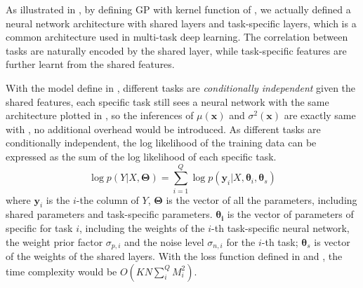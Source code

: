 As illustrated in , by defining GP with kernel function of , we actually defined a neural network architecture with shared layers and task-specific layers, which is a common architecture used in multi-task deep learning\cite{ruder2017overview}. The correlation between tasks are naturally encoded by the shared layer, while task-specific features are further learnt from the shared features. 

With the model define in , different tasks are \emph{conditionally independent} given the shared features, each specific task still sees a neural network with the same architecture plotted in , so the inferences of $\mu(\bm{x})$ and $\sigma^2(\bm{x})$ are exactly same with , no additional overhead would be introduced. As different tasks are conditionally independent, the log likelihood of the training data can be expressed as the sum of the log likelihood of each specific task.
\begin{equation}
    \label{eq:mo_likelihood}
    \log p(Y | X, \bm{\Theta}) = \sum_{i=1}^Q \log p(\bm{y}_i | X, \bm{\theta}_i, \bm{\theta}_s)
\end{equation}
where $\bm{y}_i$ is the $i$-the column of $Y$, $\bm{\Theta}$ is the vector of all the parameters, including shared parameters and task-specific parameters. $\bm{\theta_i}$ is the vector of parameters of specific for task $i$, including the weights of the $i$-th task-specific neural network, the weight prior factor $\sigma_{p, i}$ and the noise level $\sigma_{n, i}$ for the $i$-th task; $\bm{\theta}_s$ is vector of the weights of the shared layers. With the loss function defined in  and , the time complexity would be $O(KN\sum_i^Q M_i^2)$.
